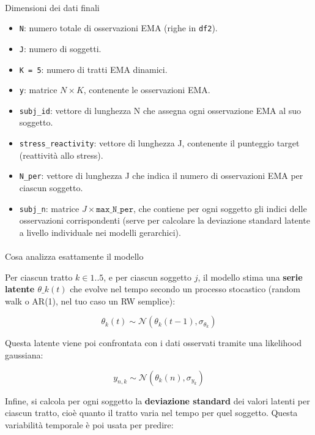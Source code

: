 \documentclass[
  11pt,
  a4paper,
  onecolumn]{article}
\makeatletter
\let\oldparagraph\paragraph
\renewcommand{\paragraph}{
    \@ifstar
      \xxxParagraphStar
      \xxxParagraphNoStar
  }
\newcommand{\xxxParagraphStar}[1]{\oldparagraph*{#1}\mbox{}}
\newcommand{\xxxParagraphNoStar}[1]{\oldparagraph{#1}\mbox{}}
\providecommand{\tightlist}{%
  \setlength{\itemsep}{0pt}\setlength{\parskip}{0pt}}
\makeatother
\begin{document}
\paragraph{Dimensioni dei dati finali}\label{dimensioni-dei-dati-finali}

\begin{itemize}
\tightlist
\item
  \texttt{N}: numero totale di osservazioni EMA (righe in \texttt{df2}).
\item
  \texttt{J}: numero di soggetti.
\item
  \texttt{K\ =\ 5}: numero di tratti EMA dinamici.
\item
  \texttt{y}: matrice \(N \times K\), contenente le osservazioni EMA.
\item
  \texttt{subj\_id}: vettore di lunghezza N che assegna ogni
  osservazione EMA al suo soggetto.
\item
  \texttt{stress\_reactivity}: vettore di lunghezza J, contenente il
  punteggio target (reattività allo stress).
\item
  \texttt{N\_per}: vettore di lunghezza J che indica il numero di
  osservazioni EMA per ciascun soggetto.
\item
  \texttt{subj\_n}: matrice \(J \times \texttt{max\_N\_per}\), che
  contiene per ogni soggetto gli indici delle osservazioni
  corrispondenti (serve per calcolare la deviazione standard latente a
  livello individuale nei modelli gerarchici).
\end{itemize}

\paragraph{Cosa analizza esattamente il
modello}\label{cosa-analizza-esattamente-il-modello}

Per ciascun tratto \(k \in 1..5\), e per ciascun soggetto \(j\), il
modello stima una \textbf{serie latente \(\theta\_{k}(t)\)} che evolve
nel tempo secondo un processo stocastico (random walk o AR(1), nel tuo
caso un RW semplice):

\[
\theta_{k}(t) \sim \mathcal{N}(\theta_{k}(t-1), \sigma_{\theta_k})
\]

Questa latente viene poi confrontata con i dati osservati tramite una
likelihood gaussiana:

\[
y_{n,k} \sim \mathcal{N}(\theta_{k}(n), \sigma_{y_k})
\]

Infine, si calcola per ogni soggetto la \textbf{deviazione standard} dei
valori latenti per ciascun tratto, cioè quanto il tratto varia nel tempo
per quel soggetto. Questa variabilità temporale è poi usata per predire:
\end{document}
